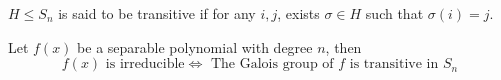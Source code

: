 \begin{definition}
  $H \leq S_n$ is said to be transitive if for any $i, j$, exists $\sigma \in H$ such that $\sigma(i) = j$.
\end{definition}

\begin{fact}
  Let $f(x)$ be a separable polynomial with degree $n$, then
  \[ f(x) \text{ is irreducible} \iff \text{ The Galois group of } f \text{ is transitive in } S_n \]
\end{fact}
